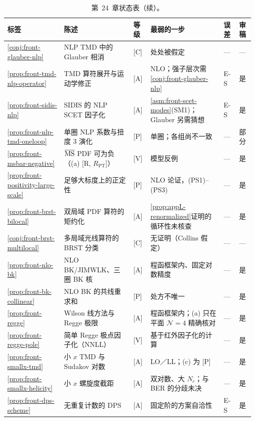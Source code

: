 \begin{table}[htbp]
\centering
\caption{第~24~章状态表（续）。}\label{tab:front-status-b}
\footnotesize
\renewcommand{\arraystretch}{1.08}
\begin{tabularx}{\textwidth}{@{}p{1.75cm}>{\raggedright\arraybackslash}Xp{1.35cm}>{\raggedright\arraybackslash}p{3.6cm}p{0.75cm}p{0.95cm}@{}}
\toprule
标签 & 陈述 & 等级 & 最弱的一步 & 误差 & 审稿 \\
\midrule
\cref{conj:front-glauber-nlp} & NLP TMD 中的 Glauber 相消 & [C] & 处处被假定 & — & — \\
\cref{prop:front-tmd-nlp-operator} & TMD 算符展开与运动学修正 & [A] & NLO；强子层次需\cref{conj:front-glauber-nlp} & E-S & 是 \\
\cref{prop:front-sidis-nlp} & SIDIS 的 NLP SCET 因子化 & [A] & \cref{asm:front-scet-modes}(SM1)；Glauber 另需猜想 & E-S & 是 \\
\cref{prop:front-nlp-tmd-oneloop} & 单圈 NLP 系数与扭度 3 演化 & [P] & 单圈；各组尚不一致 & — & 部分 \\
\cref{prop:front-msbar-negative} & $\overline{\mathrm{MS}}$ PDF 可为负（(a) [R, $R_{\mathrm{PT}}$]） & [V] & 模型反例 & — & 是 \\
\cref{prop:front-positivity-large-scale} & 足够大标度上的正定性 & [P] & NLO 论证，(PS1)--(PS3) & — & 是 \\
\cref{prop:front-brst-bilocal} & 双局域 PDF 算符的矩约化 & [A] & \cref{prop:appL-renormalized}证明的循环性未核查 & — & 是 \\
\cref{conj:front-brst-multilocal} & 多局域光线算符的 BRST 分类 & [C] & 无证明（Collins 假定） & — & — \\
\cref{prop:front-nlo-bk} & NLO BK/JIMWLK、三圈 BK 核 & [A] & 程函框架内、固定对数精度 & — & 是 \\
\cref{prop:front-bk-collinear} & NLO BK 的共线重求和 & [P] & 处方不唯一 & — & 是 \\
\cref{prop:front-regge} & Wilson 线方法与 Regge 极限 & [A] & 程函框架内；(a) 只在平面 $\mathcal N=4$ 精确核对 & — & 是 \\
\cref{prop:front-regge-pole} & 简单 Regge 极点因子化（NNLL） & [V] & 基于红外因子化的计算 & — & 是 \\
\cref{prop:front-smallx-tmd} & 小 $x$ TMD 与 Sudakov 对数 & [A] & LO／LL；(c) 为 [P] & — & 是 \\
\cref{prop:front-smallx-helicity} & 小 $x$ 螺旋度截距 & [A] & 双对数、大 $N_c$；与 BER 的分歧未决 & — & 是 \\
\cref{prop:front-dps-scheme} & 无重复计数的 DPS & [A] & 固定阶的方案自洽性 & E-S & 是 \\

\end{tabularx}
\end{table}
